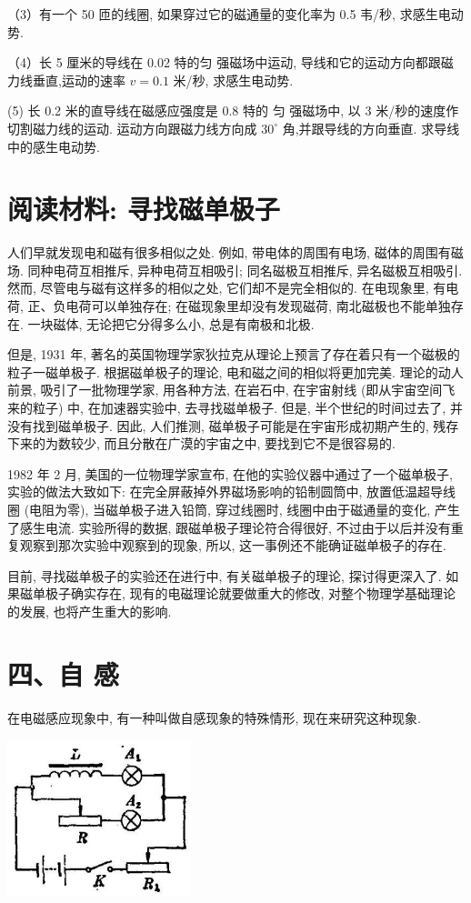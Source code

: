 \documentclass[10pt]{article}
\begin{document}
（3）有一个 50 匝的线圈, 如果穿过它的磁通量的变化率为 0.5 韦/秒, 求感生电动势.

（4）长 5 厘米的导线在 0.02 特的匀 强磁场中运动, 导线和它的运动方向都跟磁力线垂直,运动的速率 \(v = {0.1}\) 米/秒, 求感生电动势.

(5) 长 0.2 米的直导线在磁感应强度是 0.8 特的 匀 强磁场中, 以 3 米/秒的速度作切割磁力线的运动. 运动方向跟磁力线方向成 \({30}^{ \circ }\) 角,并跟导线的方向垂直. 求导线中的感生电动势.

\section*{阅读材料: 寻找磁单极子}

人们早就发现电和磁有很多相似之处. 例如, 带电体的周围有电场, 磁体的周围有磁场. 同种电荷互相推斥, 异种电荷互相吸引; 同名磁极互相推斥, 异名磁极互相吸引. 然而, 尽管电与磁有这样多的相似之处, 它们却不是完全相似的. 在电现象里, 有电荷, 正、负电荷可以单独存在; 在磁现象里却没有发现磁荷, 南北磁极也不能单独存在. 一块磁体, 无论把它分得多么小, 总是有南极和北极.

但是, 1931 年, 著名的英国物理学家狄拉克从理论上预言了存在着只有一个磁极的粒子一磁单极子. 根据磁单极子的理论, 电和磁之间的相似将更加完美. 理论的动人前景, 吸引了一批物理学家, 用各种方法, 在岩石中, 在宇宙射线 (即从宇宙空间飞来的粒子) 中, 在加速器实验中, 去寻找磁单极子. 但是, 半个世纪的时间过去了, 并没有找到磁单极子. 因此, 人们推测, 磁单极子可能是在宇宙形成初期产生的, 残存下来的为数较少, 而且分散在广漠的宇宙之中, 要找到它不是很容易的.

1982 年 2 月, 美国的一位物理学家宣布, 在他的实验仪器中通过了一个磁单极子, 实验的做法大致如下: 在完全屏蔽掉外界磁场影响的铅制圆筒中, 放置低温超导线圈 (电阻为零), 当磁单极子进入铅筒, 穿过线圈时, 线圈中由于磁通量的变化, 产生了感生电流. 实验所得的数据, 跟磁单极子理论符合得很好, 不过由于以后并没有重复观察到那次实验中观察到的现象, 所以, 这一事例还不能确证磁单极子的存在.

目前, 寻找磁单极子的实验还在进行中, 有关磁单极子的理论, 探讨得更深入了. 如果磁单极子确实存在, 现有的电磁理论就要做重大的修改, 对整个物理学基础理论的发展, 也将产生重大的影响.

\section*{四、自 感}

在电磁感应现象中, 有一种叫做自感现象的特殊情形, 现在来研究这种现象.

\begin{center}
\includegraphics[max width=0.4\textwidth]{images/01913056-1f15-74d8-9184-9aab52c9d66b_148_754576.jpg}
\end{center}
\end{document}
